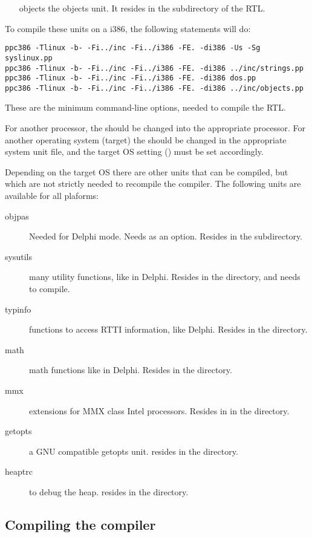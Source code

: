 {\begin{enumerate}
compiled, on go32, the  unit will be compiled).
\item[objects] the objects unit. It resides in the  subdirectory
of the RTL.
\end{enumerate}
To compile these units on a i386, the following statements will do:
\begin{verbatim}
ppc386 -Tlinux -b- -Fi../inc -Fi../i386 -FE. -di386 -Us -Sg syslinux.pp
ppc386 -Tlinux -b- -Fi../inc -Fi../i386 -FE. -di386 ../inc/strings.pp
ppc386 -Tlinux -b- -Fi../inc -Fi../i386 -FE. -di386 dos.pp
ppc386 -Tlinux -b- -Fi../inc -Fi../i386 -FE. -di386 ../inc/objects.pp
\end{verbatim}
These are the minimum command-line options, needed to compile the RTL.

For another processor, the  should be changed into the appropriate
processor. For another operating system (target) the
 should be changed in the appropriate system unit file, 
and the target OS setting () must be set accordingly.

Depending on the target OS there are other units that can be 
compiled, but which are not strictly needed to recompile the compiler.
The following units are available for all plaforms:
\begin{description}
\item[objpas] Needed for Delphi mode. Needs  as an option. Resides
in the  subdirectory.
\item[sysutils] many utility functions, like in Delphi. Resides in the
 directory, and needs  to compile.
\item[typinfo] functions to access RTTI information, like Delphi. Resides in
the  directory.
\item[math] math functions like in Delphi. Resides in the 
directory.
\item[mmx] extensions for MMX class Intel processors. Resides in
in the  directory.
\item[getopts] a GNU compatible getopts unit. resides in the 
directory.
\item[heaptrc] to debug the heap. resides in the  directory.
\end{description}

\subsection{Compiling the compiler}

}
